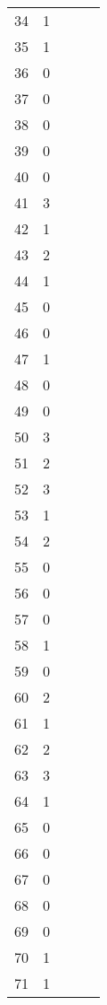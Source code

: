\begin{center}
\begin{table}[H]
\begin{tabular}{ccccc}
\num{   34} & \num{    1} \\
\num{   35} & \num{    1} \\
\num{   36} & \num{    0} \\
\num{   37} & \num{    0} \\
\num{   38} & \num{    0} \\
\num{   39} & \num{    0} \\
\num{   40} & \num{    0} \\
\num{   41} & \num{    3} \\
\num{   42} & \num{    1} \\
\num{   43} & \num{    2} \\
\num{   44} & \num{    1} \\
\num{   45} & \num{    0} \\
\num{   46} & \num{    0} \\
\num{   47} & \num{    1} \\
\num{   48} & \num{    0} \\
\num{   49} & \num{    0} \\
\num{   50} & \num{    3} \\
\num{   51} & \num{    2} \\
\num{   52} & \num{    3} \\
\num{   53} & \num{    1} \\
\num{   54} & \num{    2} \\
\num{   55} & \num{    0} \\
\num{   56} & \num{    0} \\
\num{   57} & \num{    0} \\
\num{   58} & \num{    1} \\
\num{   59} & \num{    0} \\
\num{   60} & \num{    2} \\
\num{   61} & \num{    1} \\
\num{   62} & \num{    2} \\
\num{   63} & \num{    3} \\
\num{   64} & \num{    1} \\
\num{   65} & \num{    0} \\
\num{   66} & \num{    0} \\
\num{   67} & \num{    0} \\
\num{   68} & \num{    0} \\
\num{   69} & \num{    0} \\
\num{   70} & \num{    1} \\
\num{   71} & \num{    1} \\

\end{tabular}
\end{table}
\end{center}
